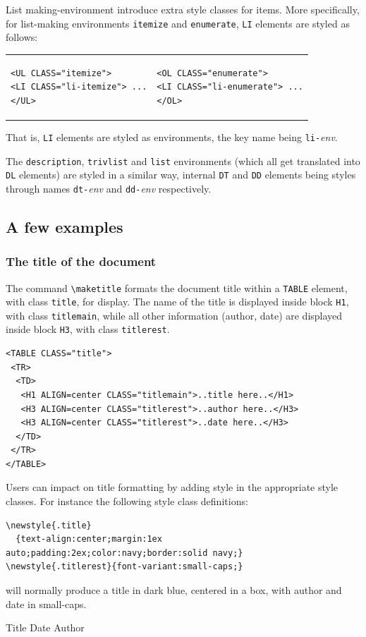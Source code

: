 List making-environment introduce extra style classes for items.
More specifically, for list-making environments
\texttt{itemize} and \texttt{enumerate},
\verb+LI+ elements are styled as follows:
\begin{center}
\begin{tabular}{p{.4\linewidth}p{\linewidth}}
\begin{verbatim}
<UL CLASS="itemize">
<LI CLASS="li-itemize"> ...
</UL>
\end{verbatim}
&
\begin{verbatim}
<OL CLASS="enumerate">
<LI CLASS="li-enumerate"> ...
</OL>
\end{verbatim}
\end{tabular}
\end{center}
That is, \verb+LI+ elements are styled as environments, the key name
being \texttt{li-}\textit{env}.

The \texttt{description}, \texttt{trivlist} and \texttt{list} environments
(which all get translated into \texttt{DL} elements) are styled in
a similar way, internal \texttt{DT} and \texttt{DD} elements being
styles through names \texttt{dt-}\textit{env} and
\texttt{dd-}\textit{env} respectively.

\subsection{A few examples}
\subsubsection{The title of the document}
The command \verb+\maketitle+ formats the document
title within a \verb+TABLE+ element, with
class \texttt{title}, for display. The name of the title is displayed
inside block \verb+H1+, with class \texttt{titlemain}, while all other
information (author, date) are displayed inside block \verb+H3+, with class
\texttt{titlerest}.
\begin{verbatim}
<TABLE CLASS="title">
 <TR>
  <TD>
   <H1 ALIGN=center CLASS="titlemain">..title here..</H1>
   <H3 ALIGN=center CLASS="titlerest">..author here..</H3>
   <H3 ALIGN=center CLASS="titlerest">..date here..</H3>
  </TD>
 </TR>
</TABLE>
\end{verbatim}
Users can impact  on title formatting by adding style in the
appropriate style classes.
For instance the following style class definitions:
\begin{verbatim}
\newstyle{.title}
  {text-align:center;margin:1ex auto;padding:2ex;color:navy;border:solid navy;}
\newstyle{.titlerest}{font-variant:small-caps;}
\end{verbatim}
will normally produce a title in dark blue, centered in a box, with
author and date in small-caps.
\begin{htmlonly}
Title
Date
Author
\end{htmlonly}

